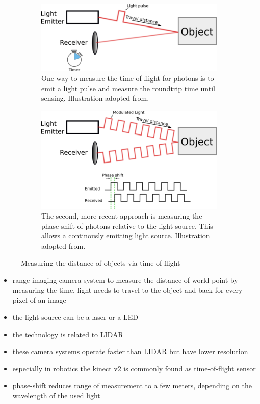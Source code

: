 \begin{figure}[H]
    \centering
    \begin{subfigure}[t]{0.45\textwidth}
        \includegraphics[width=\textwidth]{chapter03/img/tof_traveltime_original.png}
        \caption{One way to measure the time-of-flight for photons is to emit a light pulse and measure the roundtrip time until sensing. Illustration adopted from\cite{tof_cameras}.}
    \end{subfigure}
    \begin{subfigure}[t]{0.45\textwidth}
        \includegraphics[width=\textwidth]{chapter03/img/tof_phase_shift_original.png}
        \caption{The second, more recent approach is measuring the phase-shift of photons relative to the light source. This allows a continously emitting light source. Illustration adopted from\cite{tof_cameras}.}
    \end{subfigure}
    \caption[Illustration of two commonly used measuring principle for Time-of-Flight cameras]{Measuring the distance of objects via time-of-flight\label{fig:tof_illustration}}
\end{figure}

\begin{itemize}
    \item range imaging camera system to measure the distance of world point by measuring the time, light needs to travel to the object and back for every pixel of an image
    \item the light source can be a laser or a LED
    \item the technology is related to \acrshort{LIDAR}
    \item these camera systems operate faster than \acrshort{LIDAR} but have lower resolution
    \item especially in robotics the kinect v2 is commonly found as time-of-flight sensor
    \item phase-shift reduces range of measurement to a few meters, depending on the wavelength of the used light
\end{itemize}

